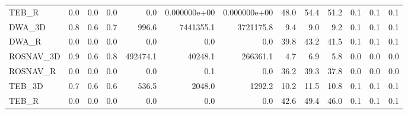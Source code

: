 \begin{tabular}{lrrrrrrrrrrrr}
TEB\_R     &                   0.0 &  0.0 &  0.0 &                  0.0 &  0.000000e+00 &  0.000000e+00 &            48.0 &  54.4 &  51.2 &                 0.1 &  0.1 &  0.1 \\
DWA\_3D    &                   0.8 &  0.6 &  0.7 &                996.6 &  7441355.1 &  3721175.8 &             9.4 &   9.0 &   9.2 &                 0.1 &  0.1 &  0.1 \\
DWA\_R     &                   0.0 &  0.0 &  0.0 &                  0.0 &        0.0 &        0.0 &            39.8 &  43.2 &  41.5 &                 0.1 &  0.1 &  0.1 \\
ROSNAV\_3D &                   0.9 &  0.6 &  0.8 &             492474.1 &    40248.1 &   266361.1 &             4.7 &   6.9 &   5.8 &                 0.0 &  0.0 &  0.0 \\
ROSNAV\_R  &                   0.0 &  0.0 &  0.0 &                  0.0 &        0.1 &        0.0 &            36.2 &  39.3 &  37.8 &                 0.0 &  0.0 &  0.0 \\
TEB\_3D    &                   0.7 &  0.6 &  0.6 &                536.5 &     2048.0 &     1292.2 &            10.2 &  11.5 &  10.8 &                 0.1 &  0.1 &  0.1 \\
TEB\_R     &                   0.0 &  0.0 &  0.0 &                  0.0 &        0.0 &        0.0 &            42.6 &  49.4 &  46.0 &                 0.1 &  0.1 &  0.1 \\
\end{tabular}